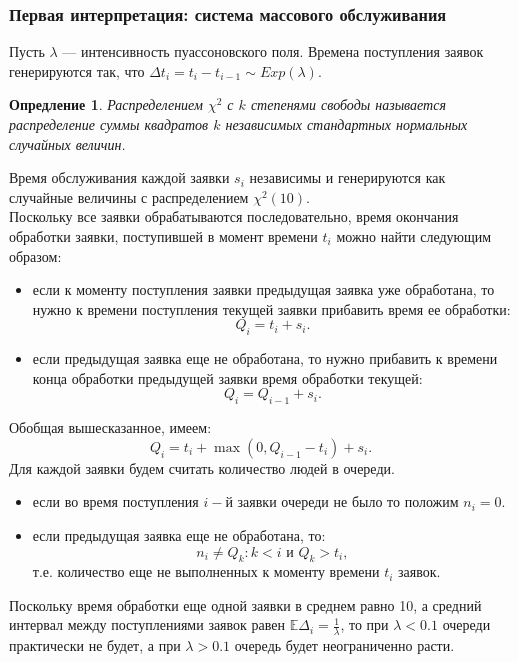 \documentclass[11pt]{article}
\newtheorem{definition}{Опредление}
\numberwithin{equation}{section}
\begin{document}
\subsubsection{Первая интерпретация: система массового обслуживания}
Пусть $\lambda$ --- интенсивность пуассоновского поля. Времена поступления заявок генерируются так, что $\Delta t_i = t_i - t_{i-1} \sim Exp(\lambda).$
\begin{definition}
	Распределением $\chi^2$ с $k$ степенями свободы называется распределение суммы квадратов $k$ независимых стандартных нормальных случайных величин.
\end{definition}
Время обслуживания каждой заявки $s_i$ независимы и генерируются как случайные величины с распределением $\chi^2(10)$.\\
Поскольку все заявки обрабатываются последовательно, время окончания обработки заявки, поступившей в момент времени $t_i$ можно найти следующим образом:
\begin{itemize}
	\item если к моменту поступления заявки предыдущая заявка уже обработана, то нужно к времени поступления текущей заявки прибавить время ее обработки:
	\[ Q_i = t_i + s_i. \]
	\item если предыдущая заявка еще не обработана, то нужно прибавить к времени конца обработки предыдущей заявки время обработки текущей:
	\[ Q_i = Q_{i-1} + s_i. \]
\end{itemize}
Обобщая вышесказанное, имеем:
\[ Q_i = t_i + \max (0,Q_{i-1} - t_i) + s_i. \]
Для каждой заявки будем считать количество людей в очереди.
\begin{itemize}
	\item если во время поступления $i-$й заявки очереди не было то положим $n_i = 0$.
	\item если предыдущая заявка еще не обработана, то:
	\[ n_i \neq Q_k: k < i \text{ и } Q_k > t_i, \]
	т.е. количество еще не выполненных к моменту времени $t_i$ заявок.
\end{itemize}
Поскольку время обработки еще одной заявки в среднем равно 10, а средний интервал между поступлениями заявок равен $\mathbb{E}\Delta_i = \frac{1}{\lambda}$, то при $\lambda < 0.1$ очереди практически не будет, а при $\lambda > 0.1$ очередь будет неограниченно расти.
\end{document}
